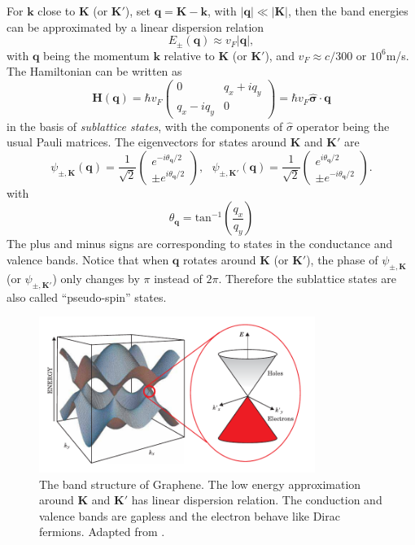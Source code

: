 \documentclass[pdflatex, sectionletters, 12pt]{pittetd}    %
\begin{document}
For $\mathbf{k}$ close to $\mathbf{K}$ (or $\mathbf{K'}$), set $\mathbf{q} = \mathbf{K} - \mathbf{k}$, with $|\mathbf{q}| \ll |\mathbf{K}|$, then the band energies can be approximated by a linear dispersion relation
$$E_{\pm}(\mathbf{q}) \approx v_F|\mathbf{q}|,$$
with $\mathbf{q}$ being the momentum $\mathbf{k}$ relative to $\mathbf{K}$ (or $\mathbf{K'}$), and $v_F \approx c/300$ or $10^6$m/s. The Hamiltonian can be written as 
\begin{equation}
\mathbf{H}(\mathbf{q}) = 
\hbar v_F 
\begin{pmatrix}
0 & q_x + iq_y \\
q_x - iq_y & 0
\end{pmatrix}
=
\hbar v_F \hat{\mathbf{\sigma}} \cdot \mathbf{q}
\label{EQN:DiracHamiltonian}
\end{equation}
in the basis of \emph{sublattice states}, with the components of $\hat{\sigma}$ operator being the usual Pauli matrices. The eigenvectors for states around $\mathbf{K}$ and $\mathbf{K'}$ are
\begin{equation}
\psi_{\pm, \mathbf{K}}(\mathbf{q}) = \frac{1}{\sqrt{2}} 
\begin{pmatrix}
e^{-i\theta_{\mathbf{q}}/2} \\
\pm e^{i\theta_{\mathbf{q}}/2}
\end{pmatrix}, \ \ \
\psi_{\pm, \mathbf{K'}}(\mathbf{q}) = \frac{1}{\sqrt{2}} 
\begin{pmatrix}
e^{i\theta_{\mathbf{q}}/2} \\
\pm e^{-i\theta_{\mathbf{q}}/2}
\end{pmatrix}.
\label{EQN:Eigenstates}
\end{equation}
with 
$$\theta_\mathbf{q} = \mathrm{tan}^{-1}\left(\frac{q_x}{q_y}\right)$$
The plus and minus signs are corresponding to states in the conductance and valence bands. Notice that when $\mathbf{q}$ rotates around $\mathbf{K}$ (or $\mathbf{K'}$), the phase of $\psi_{\pm, \mathbf{K}}$ (or $\psi_{\pm, \mathbf{K'}}$) only changes by $\pi$ instead of $2\pi$. Therefore the sublattice states are also called ``pseudo-spin'' states\cite{neto2009electronic}. 

\begin{figure}[h!]
	\centering
	\includegraphics[width=0.8\textwidth]{Drawing/GrapheneBand.pdf}
	\caption{The band structure of Graphene. The low energy approximation around $\mathbf{K}$ and $\mathbf{K'}$ has linear dispersion relation. The conduction and valence bands are gapless and the electron behave like Dirac fermions. Adapted from \cite{wilson2006electrons}.}
	\label{FIG:GrapheneBand}
\end{figure}
\end{document}
